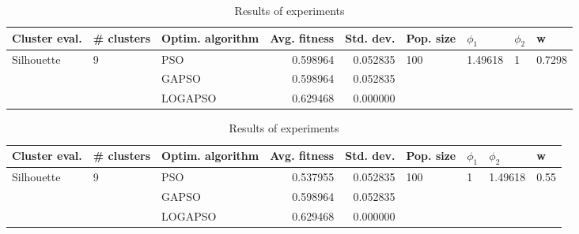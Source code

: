 \documentclass{article}
\begin{document}
\begin{table}
\centering
\caption{Results of experiments}
\begin{tabular}{lllrrllll}
\toprule
              Cluster eval. &        \# clusters & Optim. algorithm &  Avg. fitness &  Std. dev. &            Pop. size &               $\phi_{1}$ &         $\phi_{2}$ &                       w \\
\midrule
\multirow{3}{*}{Silhouette} & \multirow{3}{*}{9} &              PSO &      0.598964 &   0.052835 & \multirow{3}{*}{100} & \multirow{3}{*}{1.49618} & \multirow{3}{*}{1} & \multirow{3}{*}{0.7298} \\
                            &                    &            GAPSO &      0.598964 &   0.052835 &                      &                          &                    &                         \\
                            &                    &          LOGAPSO &      0.629468 &   0.000000 &                      &                          &                    &                         \\
\bottomrule
\end{tabular}
\end{table}
\begin{table}
\centering
\caption{Results of experiments}
\begin{tabular}{lllrrllll}
\toprule
              Cluster eval. &        \# clusters & Optim. algorithm &  Avg. fitness &  Std. dev. &            Pop. size &         $\phi_{1}$ &               $\phi_{2}$ &                     w \\
\midrule
\multirow{3}{*}{Silhouette} & \multirow{3}{*}{9} &              PSO &      0.537955 &   0.052835 & \multirow{3}{*}{100} & \multirow{3}{*}{1} & \multirow{3}{*}{1.49618} & \multirow{3}{*}{0.55} \\
                            &                    &            GAPSO &      0.598964 &   0.052835 &                      &                    &                          &                       \\
                            &                    &          LOGAPSO &      0.629468 &   0.000000 &                      &                    &                          &                       \\
\bottomrule
\end{tabular}
\end{table}
\end{document}
